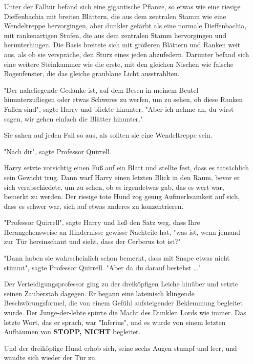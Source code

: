{Unter der Falltür befand sich eine gigantische Pflanze, so etwas wie eine riesige Dieffenbachia mit breiten Blättern, die aus dem zentralen Stamm wie eine Wendeltreppe hervorgingen, aber dunkler gefärbt als eine normale Dieffenbachia, mit rankenartigen Stufen, die aus dem zentralen Stamm hervorgingen und herunterhingen. Die Basis breitete sich mit größeren Blättern und Ranken weit aus, als ob sie verspräche, den Sturz eines jeden abzufedern. Darunter befand sich eine weitere Steinkammer wie die erste, mit den gleichen Nischen wie falsche Bogenfenster, die das gleiche graublaue Licht ausstrahlten.

"Der naheliegende Gedanke ist, auf dem Besen in meinem Beutel hinunterzufliegen oder etwas Schweres zu werfen, um zu sehen, ob diese Ranken Fallen sind", sagte Harry und blickte hinunter. "Aber ich nehme an, du wirst sagen, wir gehen einfach die Blätter hinunter."

Sie sahen auf jeden Fall so aus, als sollten sie eine Wendeltreppe sein.

"Nach dir", sagte Professor Quirrell.

Harry setzte vorsichtig einen Fuß auf ein Blatt und stellte fest, dass es tatsächlich sein Gewicht trug. Dann warf Harry einen letzten Blick in den Raum, bevor er sich verabschiedete, um zu sehen, ob es irgendetwas gab, das es wert war, bemerkt zu werden. Der riesige tote Hund zog genug Aufmerksamkeit auf sich, dass es schwer war, sich auf etwas anderes zu konzentrieren.

"Professor Quirrell", sagte Harry und ließ den Satz weg, dass Ihre Herangehensweise an Hindernisse gewisse Nachteile hat, "was ist, wenn jemand zur Tür hereinschaut und sieht, dass der Cerberus tot ist?"

"Dann haben sie wahrscheinlich schon bemerkt, dass mit Snape etwas nicht stimmt", sagte Professor Quirrell. "Aber da du darauf bestehst …"

Der Verteidigungsprofessor ging zu der dreiköpfigen Leiche hinüber und setzte seinen Zauberstab dagegen. Er begann eine lateinisch klingende Beschwörungsformel, die von einem Gefühl aufsteigender Beklemmung begleitet wurde. Der Junge-der-lebte spürte die Macht des Dunklen Lords wie immer. Das letzte Wort, das er sprach, war "Inferius", und es wurde von einem letzten Aufbäumen von \textbf{STOPP, NICHT} begleitet.

Und der dreiköpfige Hund erhob sich, seine sechs Augen stumpf und leer, und wandte sich wieder der Tür zu.

}
